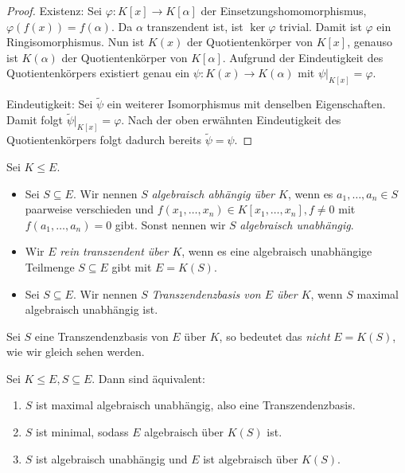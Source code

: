 \begin{proof}
    Existenz: Sei $\varphi : K[x] \to K[\alpha]$ der Einsetzungshomomorphismus, $\varphi(f(x)) = f(\alpha)$. Da $\alpha$ transzendent ist, ist $\ker \varphi$ trivial. Damit ist $\varphi$ ein Ringisomorphismus. Nun ist $K(x)$ der Quotientenkörper von $K[x]$, genauso ist $K(\alpha)$ der Quotientenkörper von $K[\alpha]$. Aufgrund der Eindeutigkeit des Quotientenkörpers existiert genau ein $\psi : K(x) \to K(\alpha)$ mit $\psi\vert_{K[x]} = \varphi$.

    Eindeutigkeit: Sei $\widetilde{\psi}$ ein weiterer Isomorphismus mit denselben Eigenschaften. Damit folgt $\widetilde{\psi}\vert_{K[x]} = \varphi$. Nach der oben erwähnten Eindeutigkeit des Quotientenkörpers folgt dadurch bereits $\widetilde{\psi} = \psi$.
\end{proof}


\begin{definition}
    Sei $K \leq E$.
    \begin{itemize}
        \item Sei $S \subseteq E$. Wir nennen $S$ \emph{algebraisch abhängig über $K$}, wenn es $a_1,\hdots,a_n\in S$ paarweise verschieden und $ f(x_1, \hdots, x_n) \in K[x_1, \hdots, x_n], f \neq 0$ mit $f(a_1,\hdots,a_n)=0$ gibt.
        Sonst nennen wir $S$ \emph{algebraisch unabhängig}.
        \item Wir $E$ \emph{rein transzendent über $K$}, wenn es eine algebraisch unabhängige Teilmenge $S \subseteq E$ gibt mit $E = K(S)$.
        \item Sei $S \subseteq E$. Wir nennen $S$ \emph{Transzendenzbasis von $E$ über $K$}, wenn $S$ maximal algebraisch unabhängig ist.
    \end{itemize}
\end{definition}

\begin{remark}
    Sei $S$ eine Transzendenzbasis von $E$ über $K$, so bedeutet das \emph{nicht} $E = K(S)$, wie wir gleich sehen werden.
\end{remark}

\begin{proposition}
    Sei $K \leq E, S \subseteq E$. Dann sind äquivalent:
    \begin{enumerate}
        \item $S$ ist maximal algebraisch unabhängig, also eine Transzendenzbasis.
        \item $S$ ist minimal, sodass $E$ algebraisch über $K(S)$ ist.
        \item $S$ ist algebraisch unabhängig und $E$ ist algebraisch über $K(S)$.
    \end{enumerate}
\end{proposition}

